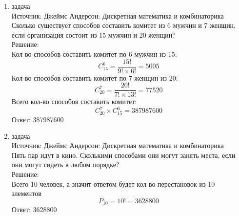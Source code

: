 \documentclass[a4paper,14pt]{extreport} %
\begin{document}
\begin{center}
\begin{enumerate}
						 
						  \item {\large задача  }\\
						 Источник: Джеймс Андерсон: Дискретная математика и комбинаторика\\
						 \vspace{15pt}
						 Сколько существует способов составить комитет из 6 мужчин и 7 женщин,
						 если организация состоит из 15 мужчин и 20 женщин?
						 \\
						 \vspace{15pt}
						 Решение:\\
						 Кол-во способов составить комитет по 6 мужчин из 15: \begin{equation}
						 	C_{15}^6 = \frac{15!}{9!\times6!} = 5005
						 \end{equation}
						 Кол-во способов составить комитет по 7 женщин из 20: \begin{equation}C_{20}^7 = \frac{20!}{7!\times13!} = 77520\end{equation}
						 Всего кол-во способов составить комитет: \begin{equation}C_{20}^7 \times C_{15}^6 = 387987600\end{equation}
						 Ответ: 387987600
						 
						 
						 
						 
						 
						  \item {\large задача  }\\
						 Источник: Джеймс Андерсон: Дискретная математика и комбинаторика\\
						 \vspace{15pt}
						 Пять пар идут в кино. Сколькими способами они могут занять места, если они могут сидеть в любом порядке?
						 \\
						 \vspace{15pt}
						 Решение:\\
						 Всего 10 человек, а значит ответом будет кол-во перестановок из 10 элементов
						 \begin{equation}P_{10} = 10! = 3628800\end{equation}
						 Ответ: 3628800
						 

\end{enumerate}
\end{center}
\end{document}
